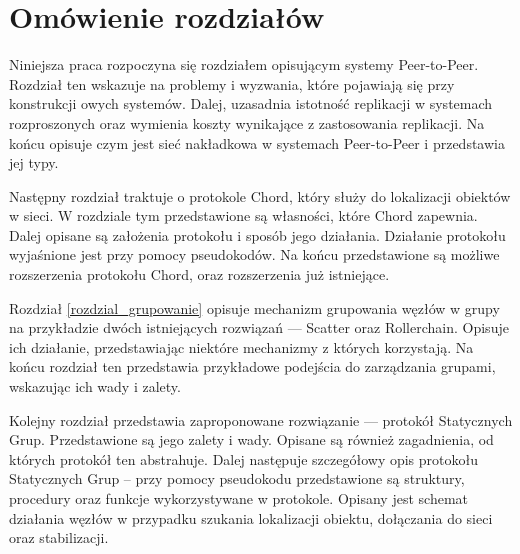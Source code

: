 \documentclass[12pt, twoside, openany]{report}
\begin{document}

\section{Omówienie rozdziałów}

Niniejsza praca rozpoczyna się rozdziałem opisującym systemy Peer-to-Peer. Rozdział ten wskazuje na problemy i wyzwania, które pojawiają się przy konstrukcji owych systemów. Dalej, uzasadnia istotność replikacji w systemach rozproszonych oraz wymienia koszty wynikające z zastosowania replikacji. Na końcu opisuje czym jest sieć nakładkowa w systemach Peer-to-Peer i przedstawia jej typy.

Następny rozdział traktuje o protokole Chord, który służy do lokalizacji obiektów w sieci. W rozdziale tym przedstawione są własności, które Chord zapewnia. Dalej opisane są założenia protokołu i sposób jego działania. Działanie protokołu wyjaśnione jest przy pomocy pseudokodów. Na końcu przedstawione są możliwe rozszerzenia protokołu Chord, oraz rozszerzenia już istniejące.

Rozdział \ref{rozdzial_grupowanie} opisuje mechanizm grupowania węzłów w grupy na przykładzie dwóch istniejących rozwiązań --- Scatter oraz Rollerchain. Opisuje ich działanie, przedstawiając niektóre mechanizmy z których korzystają. Na końcu rozdział ten przedstawia przykładowe podejścia do zarządzania grupami, wskazując ich wady i zalety.

Kolejny rozdział przedstawia zaproponowane rozwiązanie --- protokół Statycznych Grup. Przedstawione są jego zalety i wady. Opisane są również zagadnienia, od których protokół ten abstrahuje. Dalej następuje szczegółowy opis protokołu Statycznych Grup -- przy pomocy pseudokodu przedstawione są struktury, procedury oraz funkcje wykorzystywane w protokole. Opisany jest schemat działania węzłów w przypadku szukania lokalizacji obiektu, dołączania do sieci oraz stabilizacji.
\end{document}

